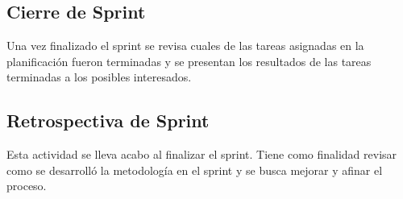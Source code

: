 \subsection{Cierre de Sprint}
Una vez finalizado el sprint se revisa cuales de las tareas asignadas en la planificación
fueron terminadas y se presentan los resultados de las tareas terminadas a los posibles
interesados.

\subsection{Retrospectiva de Sprint}

Esta actividad se lleva acabo al finalizar el sprint. Tiene como finalidad revisar como
se desarrolló la metodología en el sprint y se busca mejorar y afinar el proceso.
